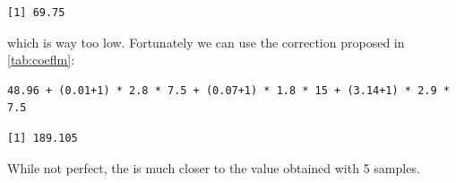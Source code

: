 \documentclass[12pt]{article}
\begin{document}
\begin{verbatim}
[1] 69.75
\end{verbatim}


which is way too low. Fortunately we can use the correction proposed in \autoref{tab:coeflm}:
\lstset{language=r,label= ,caption= ,captionpos=b,numbers=none}
\begin{lstlisting}
48.96 + (0.01+1) * 2.8 * 7.5 + (0.07+1) * 1.8 * 15 + (3.14+1) * 2.9 * 7.5
\end{lstlisting}

\begin{verbatim}
[1] 189.105
\end{verbatim}

While not perfect, the is much closer to the value obtained with 5 samples.
\end{document}

